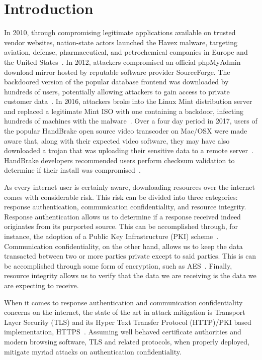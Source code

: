 \section{Introduction} \label{sec:introduction}

In 2010, through compromising legitimate applications available on trusted
vendor websites, nation-state actors launched the Havex malware, targeting
aviation, defense, pharmaceutical, and petrochemical companies in Europe and the
United States~\cite{SCA-HAVEX1, SCA-HAVEX2}. In 2012, attackers compromised an
official phpMyAdmin download mirror hosted by reputable software provider
SourceForge. The backdoored version of the popular database frontend was
downloaded by hundreds of users, potentially allowing attackers to gain access
to private customer data~\cite{SCA-PMA1, SCA-PMA2}. In 2016, attackers broke
into the Linux Mint distribution server and replaced a legitimate Mint ISO with
one containing a backdoor, infecting hundreds of machines with the
malware~\cite{SCA-MINT1, SCA-MINT2}. Over a four day period in 2017, users of
the popular HandBrake open source video transcoder on Mac/OSX were made aware
that, along with their expected video software, they may have also downloaded a
trojan that was uploading their sensitive data to a remote
server~\cite{SCA-HB1}. HandBrake developers recommended users perform checksum
validation to determine if their install was compromised~\cite{SCA-HB2}.

As every internet user is certainly aware, downloading resources over the
internet comes with considerable risk. This risk can be divided into three
categories: response authentication, communication confidentiality, and resource
integrity. Response authentication allows us to determine if a response received
indeed originates from its purported source. This can be accomplished through,
for instance, the adoption of a Public Key Infrastructure (PKI)
scheme~\cite{PKI}. Communication confidentiality, on the other hand, allows us
to keep the data transacted between two or more parties private except to said
parties. This is can be accomplished through some form of encryption, such as
AES~\cite{AES}. Finally, resource integrity allows us to verify that the data we
are receiving is the data we are expecting to receive.

When it comes to response authentication and communication confidentiality
concerns on the internet, the state of the art in attack mitigation is Transport
Layer Security (TLS) and its Hyper Text Transfer Protocol (HTTP)/PKI based
implementation, HTTPS~\cite{TLS1.2, TLS1, TLS0, HTTPS, PKI}. Assuming well
behaved certificate authorities and modern browsing software, TLS and related
protocols, when properly deployed, mitigate myriad attacks on authentication
confidentiality.


